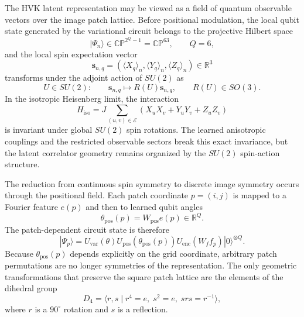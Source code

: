 \documentclass[11pt]{article}
\begin{document}
The HVK latent representation may be viewed as a field of quantum observable vectors over the image patch lattice. Before positional modulation, the local qubit state generated by the variational circuit belongs to the projective Hilbert space
\begin{equation}
|\Psi_n\rangle \in \mathbb{CP}^{2^Q-1}=\mathbb{CP}^{63},
\qquad Q=6,
\end{equation}
and the local spin expectation vector
\begin{equation}
\mathbf{s}_{n,q}
=
\left(
\langle X_q\rangle_n,
\langle Y_q\rangle_n,
\langle Z_q\rangle_n
\right)
\in \mathbb{R}^{3}
\end{equation}
transforms under the adjoint action of $SU(2)$ as
\begin{equation}
U\in SU(2):
\qquad
\mathbf{s}_{n,q}\mapsto R(U)\mathbf{s}_{n,q},
\qquad
R(U)\in SO(3).
\end{equation}
In the isotropic Heisenberg limit, the interaction
\begin{equation}
H_{\mathrm{iso}}
=
J\sum_{(u,v)\in\mathcal{E}}
\left(
X_uX_v+Y_uY_v+Z_uZ_v
\right)
\end{equation}
is invariant under global $SU(2)$ spin rotations. The learned anisotropic couplings and the restricted observable sectors break this exact invariance, but the latent correlator geometry remains organized by the $SU(2)$ spin-action structure.

The reduction from continuous spin symmetry to discrete image symmetry occurs through the positional field. Each patch coordinate $p=(i,j)$ is mapped to a Fourier feature $e(p)$ and then to learned qubit angles
\begin{equation}
\theta_{\mathrm{pos}}(p)=W_{\mathrm{pos}}e(p)\in\mathbb{R}^{Q}.
\end{equation}
The patch-dependent circuit state is therefore
\begin{equation}
|\Psi_{p}\rangle
=
U_{\mathrm{var}}(\theta)
U_{\mathrm{pos}}\!\left(\theta_{\mathrm{pos}}(p)\right)
U_{\mathrm{enc}}\!\left(W_f f_p\right)
|0\rangle^{\otimes Q}.
\end{equation}
Because $\theta_{\mathrm{pos}}(p)$ depends explicitly on the grid coordinate, arbitrary patch permutations are no longer symmetries of the representation. The only geometric transformations that preserve the square patch lattice are the elements of the dihedral group
\begin{equation}
D_4
=
\langle r,s \mid r^4=e,\; s^2=e,\; srs=r^{-1}\rangle,
\end{equation}
where $r$ is a $90^\circ$ rotation and $s$ is a reflection.
\end{document}
